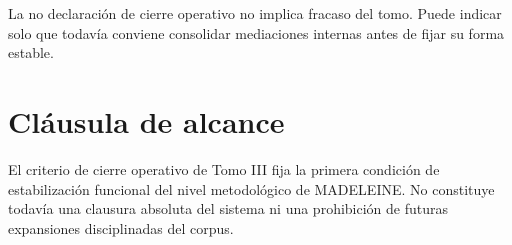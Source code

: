 \begin{observation}
La no declaración de cierre operativo no implica fracaso del tomo. Puede indicar solo que todavía conviene consolidar mediaciones internas antes de fijar su forma estable.
\end{observation}

\section{Cláusula de alcance}
\begin{observation}
El criterio de cierre operativo de Tomo III fija la primera condición de estabilización funcional del nivel metodológico de MADELEINE. No constituye todavía una clausura absoluta del sistema ni una prohibición de futuras expansiones disciplinadas del corpus.
\end{observation}

